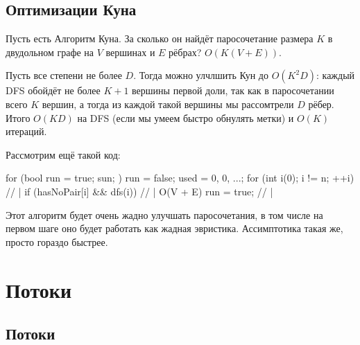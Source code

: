 
\section{Оптимизации Куна}

Пусть есть Алгоритм Куна.
За сколько он найдёт паросочетание размера $K$ в двудольном графе на $V$ вершинах и $E$ рёбрах?
$O(K(V+E))$.

Пусть все степени не более $D$.
Тогда можно улчлшить Кун до $O(K^2D)$: каждый DFS обойдёт не более $K + 1$ вершины первой доли,
так как в паросочетании всего $K$ вершин, а тогда из каждой такой вершины мы рассомтрели $D$ рёбер.
Итого $O(KD)$ на DFS (если мы умеем быстро обнулять метки) и $O(K)$ итераций.

Рассмотрим ещё такой код:
\begin{cppcode}
for (bool run = true; sun; ) {
	run = false;
	used = {0, 0, ...};
	for (int i(0); i != n; ++i)     // |
		if (hasNoPair[i] && dfs(i)) // | O(V + E)
			run = true;             // |
}
\end{cppcode}
Этот алгоритм будет очень жадно улучшать паросочетания, в том числе на первом шаге оно будет работать как жадная эвристика.
Ассимптотика такая же, просто гораздо быстрее.

\chapter{Потоки}
\section{Потоки}

